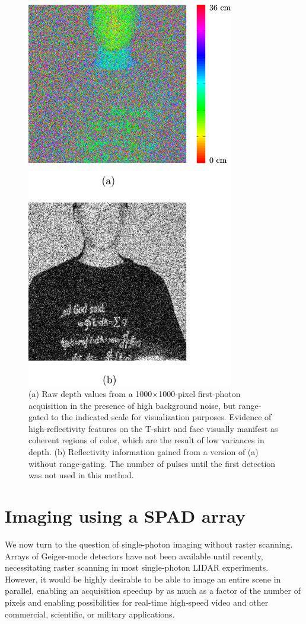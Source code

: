 \begin{figure}[h!]
\centerline{\includegraphics[height=17cm]{figure-first-intensityfromdepth.pdf}}
\caption{(a) Raw depth values from a 1000$\times$1000-pixel first-photon acquisition in the presence of high background noise, but range-gated to the indicated scale for visualization purposes. Evidence of high-reflectivity features on the T-shirt and face visually manifest as coherent regions of color, which are the result of low variances in depth. (b) Reflectivity information gained from a version of (a) without range-gating. The number of pulses until the first detection was not used in this method.}
\label{figure:first-intensityfromdepth}
\end{figure}

\section{Imaging using a SPAD array}

We now turn to the question of single-photon imaging without raster scanning. Arrays of Geiger-mode detectors have not been available until recently, necessitating raster scanning in most single-photon LIDAR experiments. However, it would be highly desirable to be able to image an entire scene in parallel, enabling an acquisition speedup by as much as a factor of the number of pixels and enabling possibilities for real-time high-speed video and other commercial, scientific, or military applications.

